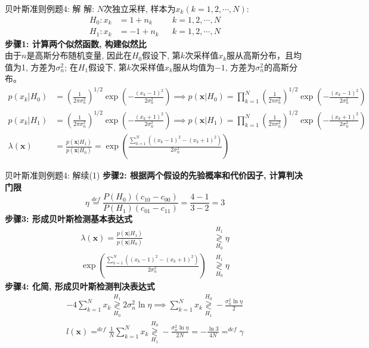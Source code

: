 \begin{frame}[shrink]{贝叶斯准则例题4: 解}
解: $N$次独立采样, 样本为$x_k(k=1,2,\cdots,N)$:
\begin{align*}
H_0: x_k&=1+n_k && k=1,2,\cdots,N\\
H_1: x_k&=-1+n_k && k=1,2,\cdots,N
\end{align*}
\textbf{步骤1: 计算两个似然函数, 构建似然比}\\
由于$n$是高斯分布随机变量, 因此在$H_0$假设下, 第$k$次采样值$x_k$服从高斯分布，且均值为1, 方差为$\sigma_n^2$; 在$H_1$假设下, 第$k$次采样值$x_k$服从均值为$-1$, 方差为$\sigma_n^2$的高斯分布。
\begin{align*}
p(x_k|H_0)&=\left(\frac{1}{2\pi\sigma_n^2}\right)^{1/2}\exp\left(-\frac{(x_k-1)^2}{2\sigma_n^2}\right)\implies p(\bm{x}|H_0)=\prod_{k=1}^{N}\left(\frac{1}{2\pi\sigma_n^2}\right)^{1/2}\exp\left(-\frac{(x_k-1)^2}{2\sigma_n^2}\right)\\
p(x_k|H_1)&=\left(\frac{1}{2\pi\sigma_n^2}\right)^{1/2}\exp\left(-\frac{(x_k+1)^2}{2\sigma_n^2}\right)\implies p(\bm{x}|H_1)=\prod_{k=1}^{N}\left(\frac{1}{2\pi\sigma_n^2}\right)^{1/2}\exp\left(-\frac{(x_k+1)^2}{2\sigma_n^2}\right)\\
\lambda(\bm{x})&=\frac{p(\bm{x}|H_1)}{p(\bm{x}|H_0)}=\exp\left(\frac{\sum\limits_{k=1}^{N}\left((x_k-1)^2-(x_k+1)^2\right)}{2\sigma_n^2}\right)
\end{align*} 
\end{frame}

\begin{frame}[shrink]{贝叶斯准则例题4: 解续(1)}
\textbf{步骤2: 根据两个假设的先验概率和代价因子, 计算判决门限}
\[\eta\mathop{=}\limits^{def}\frac{P(H_0)(c_{10}-c_{00})}{P(H_1)(c_{01}-c_{11})}=\frac{4-1}{3-2}=3 \]
\textbf{步骤3: 形成贝叶斯检测基本表达式}
\begin{align*}
\lambda(\bm{x})=\frac{p(\bm{x}|H_1)}{p(\bm{x}|H_0)}&\mathop{\gtrless}\limits_{H_0}^{H_1}\eta\\
\exp\left(\frac{\sum\limits_{k=1}^{N}\left((x_k-1)^2-(x_k+1)^2\right)}{2\sigma_n^2}\right)&\mathop{\gtrless}\limits_{H_0}^{H_1}\eta
\end{align*} 
\textbf{步骤4: 化简, 形成贝叶斯检测判决表达式}
\begin{align*}
-4\sum\limits_{k=1}^{N}x_k\mathop{\gtrless}\limits_{H_0}^{H_1}2\sigma_n^2\ln\eta\implies \sum\limits_{k=1}^{N}x_k\mathop{\gtrless}\limits_{H_1}^{H_0}-\frac{\sigma_n^2\ln\eta}{2}\\
l(\bm{x})\mathop{=}^{def}\frac{1}{N}\sum\limits_{k=1}^{N}x_k\mathop{\gtrless}\limits_{H_1}^{H_0}-\frac{\sigma_n^2\ln\eta}{2N}=-\frac{\ln3}{4N}\mathop{=}^{def}\gamma\\
\end{align*} 
\end{frame}

